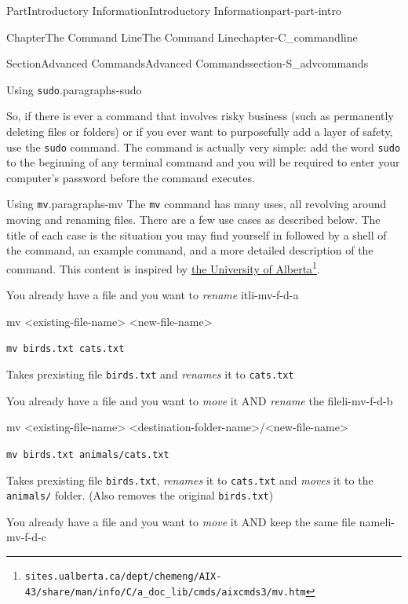 \documentclass[twoside,10pt,]{book}
\newcommand{\mono}[1]{\texttt{#1}}
\begin{document}
\begin{partptx}{Part}{Introductory Information}{}{Introductory Information}{}{}{part-part-intro}
\begin{chapterptx}{Chapter}{The Command Line}{}{The Command Line}{}{}{chapter-C_commandline}
\begin{sectionptx}{Section}{Advanced Commands}{}{Advanced Commands}{}{}{section-S_advcommands}
\begin{paragraphs}{Using \mono{sudo}.}{paragraphs-sudo}
\par
So, if there is ever a command that involves risky business (such as permanently deleting files or folders) or if you ever want to purposefully add a layer of safety, use the \mono{sudo} command. The command is actually very simple: add the word \mono{sudo} to the beginning of any terminal command and you will be required to enter your computer's password before the command executes.%
\end{paragraphs}%
\begin{paragraphs}{Using \mono{mv}.}{paragraphs-mv}%
%
%
%
%
The \mono{mv} command has many uses, all revolving around moving and renaming files. There are a few use cases as described below. The title of each case is the situation you may find yourself in followed by a shell of the command, an example command, and a more detailed description of the command. This content is inspired by \href{https://sites.ualberta.ca/dept/chemeng/AIX-43/share/man/info/C/a_doc_lib/cmds/aixcmds3/mv.htm}{the University of Alberta}\footnote{\nolinkurl{sites.ualberta.ca/dept/chemeng/AIX-43/share/man/info/C/a_doc_lib/cmds/aixcmds3/mv.htm}\label{fn-mv-f-c}}.%
\begin{descriptionlist}
\begin{dlinarrow}{You already have a file and you want to \emph{rename} it}{li-mv-f-d-a}%
%
\begin{codedisplay}
mv <existing-file-name> <new-file-name>
\end{codedisplay}
%
\par
\mono{mv birds.txt cats.txt}%
\par
Takes prexisting file \mono{birds.txt} and \emph{renames} it to \mono{cats.txt}%
\end{dlinarrow}%
\begin{dlinarrow}{You already have a file and you want to \emph{move} it AND \emph{rename} the file}{li-mv-f-d-b}%
%
\begin{codedisplay}
mv <existing-file-name>
	<destination-folder-name>/<new-file-name>
\end{codedisplay}
%
\par
\mono{mv birds.txt animals/cats.txt}%
\par
Takes prexisting file \mono{birds.txt}, \emph{renames} it to \mono{cats.txt} and \emph{moves} it to the \mono{animals/} folder. (Also removes the original \mono{birds.txt})%
\end{dlinarrow}%
\begin{dlinarrow}{You already have a file and you want to \emph{move} it AND keep the same file name}{li-mv-f-d-c}%

\end{dlinarrow}
\end{descriptionlist}
\end{paragraphs}
\end{sectionptx}
\end{chapterptx}
\end{partptx}
\end{document}
